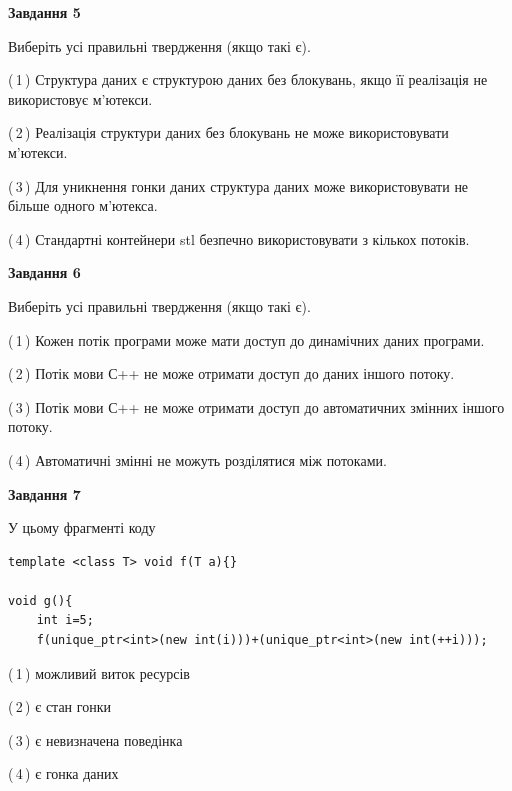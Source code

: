 \documentclass[12pt, ukrainian]{article}
\begin{document}
\begin {large}
{\begin{center}
\textbf{Завдання 5}
\end{center}

Виберіть усі правильні твердження (якщо такі є).\par
\vspace{2mm}

(\,1\,) Структура даних є структурою даних без блокувань, якщо її реалізація не використовує м’ютекси.%

(\,2\,) Реалізація структури даних без блокувань не може використовувати м’ютекси.%

(\,3\,) Для уникнення гонки даних структура даних може використовувати не більше одного м’ютекса.%

(\,4\,) Стандартні контейнери stl безпечно використовувати з кількох потоків.%
\newpage


\begin{center}
\textbf{Завдання 6}
\end{center}

Виберіть усі правильні твердження (якщо такі є).\par
\vspace{2mm}

(\,1\,) Кожен потік програми може мати доступ до динамічних даних програми.%

(\,2\,) Потік мови С++ не може отримати доступ до даних іншого потоку.%

(\,3\,) Потік мови С++ не може отримати доступ до автоматичних змінних іншого потоку.%

(\,4\,) Автоматичні змінні не можуть розділятися між потоками.%


\begin{center}
\textbf{Завдання 7}
\end{center}

У цьому фрагменті коду
\begin{verbatim}
template <class T> void f(T a){}

void g(){
    int i=5;
    f(unique_ptr<int>(new int(i)))+(unique_ptr<int>(new int(++i)));
\end{verbatim}
(\,1\,) можливий виток ресурсів%

(\,2\,) є стан гонки%

(\,3\,) є невизначена поведінка%

(\,4\,) є гонка даних%

}
\end {large}

\vspace{4mm}
\newpage
\end{document}
